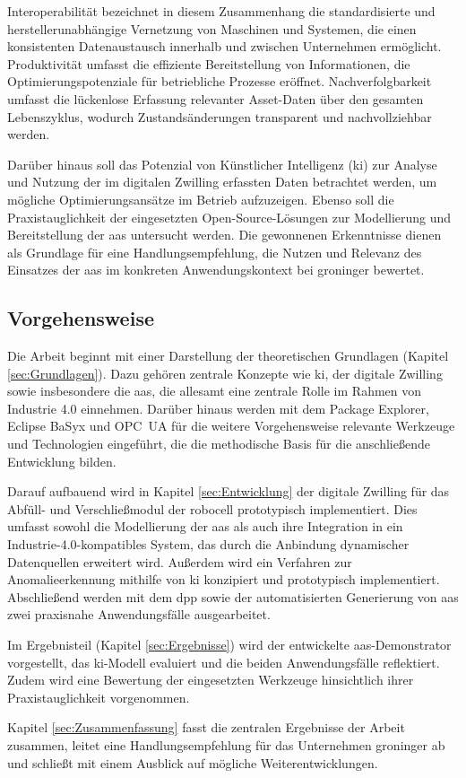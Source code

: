 Interoperabilität bezeichnet in diesem Zusammenhang die standardisierte und herstellerunabhängige Vernetzung von Maschinen und Systemen, die einen konsistenten Datenaustausch innerhalb und zwischen Unternehmen ermöglicht. 
Produktivität umfasst die effiziente Bereitstellung von Informationen, die Optimierungspotenziale für betriebliche Prozesse eröffnet. 
Nachverfolgbarkeit umfasst die lückenlose Erfassung relevanter Asset-Daten über den gesamten Lebenszyklus, wodurch Zustandsänderungen transparent und nachvollziehbar werden.

Darüber hinaus soll das Potenzial von Künstlicher Intelligenz (\acs{ki}) zur Analyse und Nutzung der im digitalen Zwilling erfassten Daten betrachtet werden, um mögliche Optimierungsansätze im Betrieb aufzuzeigen. 
Ebenso soll die Praxistauglichkeit der eingesetzten Open-Source-Lösungen zur Modellierung und Bereitstellung der \acs{aas} untersucht werden.
Die gewonnenen Erkenntnisse dienen als Grundlage für eine Handlungsempfehlung, die Nutzen und Relevanz des Einsatzes der \acs{aas} im konkreten Anwendungskontext bei groninger bewertet.

\subsection{Vorgehensweise}

Die Arbeit beginnt mit einer Darstellung der theoretischen Grundlagen (Kapitel \ref{sec:Grundlagen}). 
Dazu gehören zentrale Konzepte wie \acs{ki}, der digitale Zwilling sowie insbesondere die \acs{aas}, die allesamt eine zentrale Rolle im Rahmen von Industrie 4.0 einnehmen. 
Darüber hinaus werden mit dem Package Explorer, Eclipse BaSyx und OPC~UA für die weitere Vorgehensweise relevante Werkzeuge und Technologien eingeführt, die die methodische Basis für die anschließende Entwicklung bilden.

Darauf aufbauend wird in Kapitel \ref{sec:Entwicklung} der digitale Zwilling für das Abfüll- und Verschließmodul der robocell prototypisch implementiert. 
Dies umfasst sowohl die Modellierung der \acs{aas} als auch ihre Integration in ein Industrie-4.0-kompatibles System, das durch die Anbindung dynamischer Datenquellen erweitert wird. 
Außerdem wird ein Verfahren zur Anomalieerkennung mithilfe von \acs{ki} konzipiert und prototypisch implementiert. 
Abschließend werden mit dem \acs{dpp} sowie der automatisierten Generierung von \acs{aas} zwei praxisnahe Anwendungsfälle ausgearbeitet.

Im Ergebnisteil (Kapitel \ref{sec:Ergebnisse}) wird der entwickelte \acs{aas}-Demonstrator vorgestellt, das \acs{ki}-Modell evaluiert und die beiden Anwendungsfälle reflektiert. 
Zudem wird eine Bewertung der eingesetzten Werkzeuge hinsichtlich ihrer Praxistauglichkeit vorgenommen.

Kapitel \ref{sec:Zusammenfassung} fasst die zentralen Ergebnisse der Arbeit zusammen, leitet eine Handlungsempfehlung für das Unternehmen groninger ab und schließt mit einem Ausblick auf mögliche Weiterentwicklungen.
